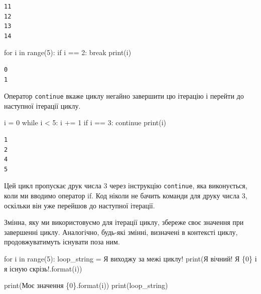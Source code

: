 \documentclass[
  letterpaper,
]{report}
\newenvironment{Shaded}{\begin{snugshade}}{\end{snugshade}}
\newcommand{\BuiltInTok}[1]{\textcolor[rgb]{0.00,0.23,0.31}{#1}}
\newcommand{\ControlFlowTok}[1]{\textcolor[rgb]{0.00,0.23,0.31}{#1}}
\newcommand{\DecValTok}[1]{\textcolor[rgb]{0.68,0.00,0.00}{#1}}
\newcommand{\KeywordTok}[1]{\textcolor[rgb]{0.00,0.23,0.31}{#1}}
\newcommand{\NormalTok}[1]{\textcolor[rgb]{0.00,0.23,0.31}{#1}}
\newcommand{\OperatorTok}[1]{\textcolor[rgb]{0.37,0.37,0.37}{#1}}
\newcommand{\SpecialCharTok}[1]{\textcolor[rgb]{0.37,0.37,0.37}{#1}}
\newcommand{\StringTok}[1]{\textcolor[rgb]{0.13,0.47,0.30}{#1}}
\begin{document}
\begin{verbatim}
11
12
13
14
\end{verbatim}

\begin{Shaded}
\begin{Highlighting}[]
\ControlFlowTok{for}\NormalTok{ i }\KeywordTok{in} \BuiltInTok{range}\NormalTok{(}\DecValTok{5}\NormalTok{):}
    \ControlFlowTok{if}\NormalTok{ i }\OperatorTok{==} \DecValTok{2}\NormalTok{:}
        \ControlFlowTok{break}
    \BuiltInTok{print}\NormalTok{(i)}
\end{Highlighting}
\end{Shaded}

\begin{verbatim}
0
1
\end{verbatim}

Оператор \texttt{continue} вкаже циклу негайно завершити цю ітерацію і
перейти до наступної ітерації циклу.

\begin{Shaded}
\begin{Highlighting}[]
\NormalTok{i }\OperatorTok{=} \DecValTok{0}
\ControlFlowTok{while}\NormalTok{ i }\OperatorTok{\textless{}} \DecValTok{5}\NormalTok{:}
\NormalTok{    i }\OperatorTok{+=} \DecValTok{1}
    \ControlFlowTok{if}\NormalTok{ i }\OperatorTok{==} \DecValTok{3}\NormalTok{:}
        \ControlFlowTok{continue}
    \BuiltInTok{print}\NormalTok{(i)}
\end{Highlighting}
\end{Shaded}

\begin{verbatim}
1
2
4
5
\end{verbatim}

Цей цикл пропускає друк числа \(3\) через інструкцію \texttt{continue},
яка виконується, коли ми вводимо оператор if. Код ніколи не бачить
команди для друку числа \(3\), оскільки він уже перейшов до наступної
ітерації.

Змінна, яку ми використовуємо для ітерації циклу, збереже своє значення
при завершенні циклу. Аналогічно, будь-які змінні, визначені в контексті
циклу, продовжуватимуть існувати поза ним.

\begin{Shaded}
\begin{Highlighting}[]
\ControlFlowTok{for}\NormalTok{ i }\KeywordTok{in} \BuiltInTok{range}\NormalTok{(}\DecValTok{5}\NormalTok{):}
\NormalTok{    loop\_string }\OperatorTok{=} \StringTok{\textquotesingle{}Я виходжу за межі циклу!\textquotesingle{}}
    \BuiltInTok{print}\NormalTok{(}\StringTok{\textquotesingle{}Я вічний! Я }\SpecialCharTok{\{0\}}\StringTok{ і я існую скрізь!\textquotesingle{}}\NormalTok{.}\BuiltInTok{format}\NormalTok{(i))}

\BuiltInTok{print}\NormalTok{(}\StringTok{\textquotesingle{}Моє значення }\SpecialCharTok{\{0\}}\StringTok{\textquotesingle{}}\NormalTok{.}\BuiltInTok{format}\NormalTok{(i))}
\BuiltInTok{print}\NormalTok{(loop\_string)}
\end{Highlighting}
\end{Shaded}
\end{document}
